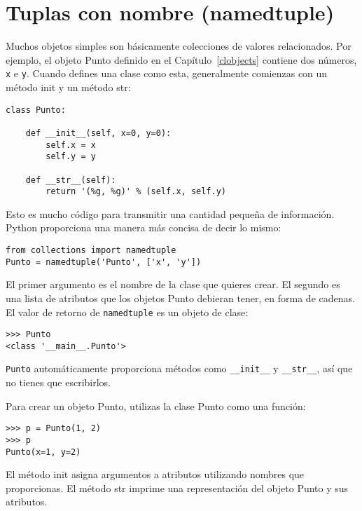 \documentclass[10pt]{book}
\begin{document}
\section{Tuplas con nombre (namedtuple)}

Muchos objetos simples son básicamente colecciones de valores relacionados.
Por ejemplo, el objeto Punto definido en el Capítulo~\ref{clobjects} contiene
dos números, {\tt x} e {\tt y}.  Cuando defines una clase como
esta, generalmente comienzas con un método init y un método str:

\begin{verbatim}
class Punto:

    def __init__(self, x=0, y=0):
        self.x = x
        self.y = y

    def __str__(self):
        return '(%g, %g)' % (self.x, self.y)
\end{verbatim}

Esto es mucho código para transmitir una cantidad pequeña de información.
Python proporciona una manera más concisa de decir lo mismo:

\begin{verbatim}
from collections import namedtuple
Punto = namedtuple('Punto', ['x', 'y'])
\end{verbatim}

El primer argumento es el nombre de la clase que quieres crear.
El segundo es una lista de atributos que los objetos Punto debieran tener,
en forma de cadenas.  El valor de retorno de {\tt namedtuple} es un objeto de clase:

\begin{verbatim}
>>> Punto
<class '__main__.Punto'>
\end{verbatim}

{\tt Punto} automáticamente proporciona métodos como \verb"__init__" y
\verb"__str__", así que no tienes que escribirlos.

Para crear un objeto Punto, utilizas la clase Punto como una función:

\begin{verbatim}
>>> p = Punto(1, 2)
>>> p
Punto(x=1, y=2)
\end{verbatim}

El método init asigna argumentos a atributos utilizando nombres
que proporcionas.  El método str imprime una representación del objeto Punto
y sus atributos.
\end{document}

